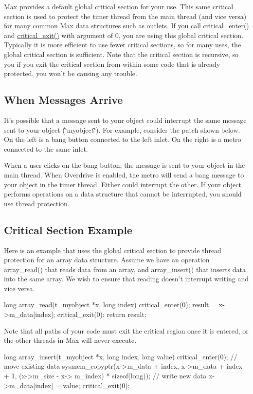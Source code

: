 Max provides a default global critical section for your use. This same critical section is used to protect the timer thread from the main thread (and vice versa) for many common Max data structures such as outlets. If you call \hyperlink{group__critical_ga246445cffc822f756ac6fb34a055022d}{critical\_\-enter()} and \hyperlink{group__critical_ga269f46fef96f91143fc1616a4105984c}{critical\_\-exit()} with argument of 0, you are using this global critical section. Typically it is more efficient to use fewer critical sections, so for many uses, the global critical section is sufficient. Note that the critical section is recursive, so you if you exit the critical section from within some code that is already protected, you won't be causing any trouble.\hypertarget{chapter_threading_chapter_threading_protection_arrival}{}\subsection{When Messages Arrive}\label{chapter_threading_chapter_threading_protection_arrival}
It's possible that a message sent to your object could interrupt the same message sent to your object (\char`\"{}myobject\char`\"{}). For example, consider the patch shown below. On the left is a bang button connected to the left inlet. On the right is a metro connected to the same inlet.

When a user clicks on the bang button, the message is sent to your object in the main thread. When Overdrive is enabled, the metro will send a bang message to your object in the timer thread. Either could interrupt the other. If your object performs operations on a data structure that cannot be interrupted, you should use thread protection.\hypertarget{chapter_threading_chapter_threading_protection_example}{}\subsection{Critical Section Example}\label{chapter_threading_chapter_threading_protection_example}
Here is an example that uses the global critical section to provide thread protection for an array data structure. Assume we have an operation array\_\-read() that reads data from an array, and array\_\-insert() that inserts data into the same array. We wish to ensure that reading doesn't interrupt writing and vice versa.


\begin{DoxyCode}
    long array_read(t_myobject *x, long index)
    {
        critical_enter(0);
        result = x->m_data[index];
        critical_exit(0);
        return result;
    }
\end{DoxyCode}


Note that all paths of your code must exit the critical region once it is entered, or the other threads in Max will never execute. 
\begin{DoxyCode}
    long array_insert(t_myobject *x, long index, long value)
    {
        critical_enter(0);
        // move existing data
        sysmem_copyptr(x->m_data + index, x->m_data + index + 1, (x->m_size - x->
      m_index) * sizeof(long));
        // write new data
        x->m_data[index] = value;
        critical_exit(0);
    }
\end{DoxyCode}
 